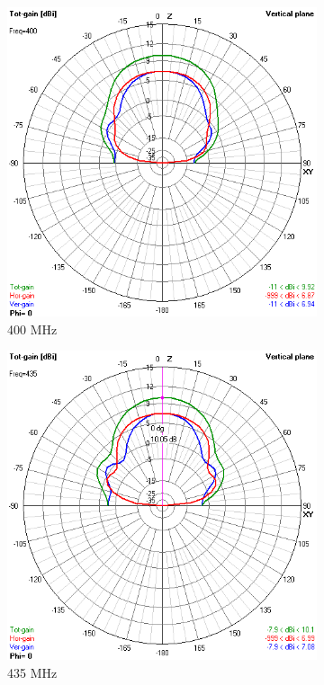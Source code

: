 \documentclass[12pt]{article}
\begin{document}
\begin{figure}[H]
	\centering
	\begin{subfigure}{.48\textwidth}
		\centering
		\includegraphics[width=.75\linewidth]{helix_1_400.png}
		\caption{400 MHz}
	\end{subfigure}%
	\begin{subfigure}{.48\textwidth}
		\centering
		\includegraphics[width=.75\linewidth]{helix_1_435.png}
		\caption{435 MHz}
	\end{subfigure}
	\begin{subfigure}{.48\textwidth}
		\centering

\end{subfigure}
\end{figure}
\end{document}
